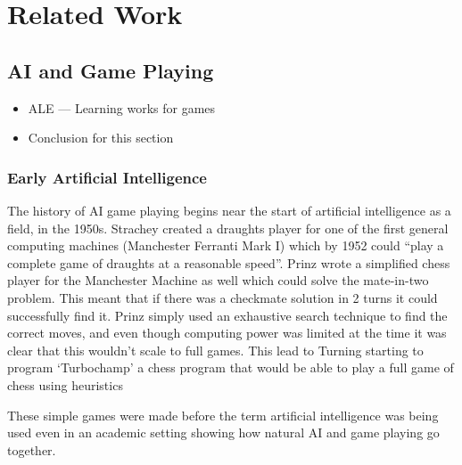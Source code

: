 \documentclass[a4paper]{article}
\begin{document}
\section{Related Work}
\subsection{AI and Game Playing}
\begin{itemize}
    \item ALE --- Learning works for games
    \item Conclusion for this section
\end{itemize}

\subsubsection{Early Artificial Intelligence}
The history of AI game playing begins near the start of artificial intelligence as a field, in the 1950s.
Strachey created a draughts player for one of the first general computing machines (Manchester Ferranti Mark I) which by  1952 could ``play a complete game of draughts at a reasonable speed''\cite{BreifHistoryComputing}.
Prinz wrote a simplified chess player for the Manchester Machine as well which could solve the mate-in-two problem.
This meant that if there was a checkmate solution in 2 turns it could successfully find it\cite{BreifHistoryComputing}.
Prinz simply used an exhaustive search technique to find the correct moves, and even though computing power was limited at the time it was clear that this wouldn't scale to full games.
This lead to Turning starting to program `Turbochamp' a chess program that would be able to play a full game of chess using heuristics\cite{BreifHistoryComputing}
\par
These simple games were made before the term artificial intelligence was being used even in an academic setting showing how natural AI and game playing go together.
\end{document}
